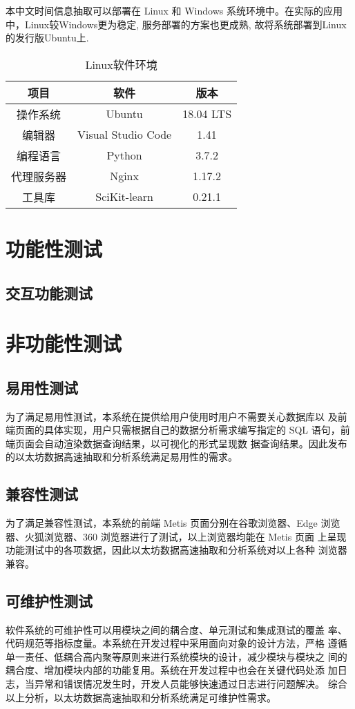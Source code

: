 本中文时间信息抽取可以部署在 Linux 和 Windows 系统环境中。在实际的应用
中，Linux较Windows更为稳定, 服务部署的方案也更成熟, 故将系统部署到Linux的发行版Ubuntu上.

\begin{table}[h]
    \centering
    \caption{Linux软件环境}
    \begin{tabular}{|*{3}{c|}}
        \hline
        项目 & 软件 & 版本 \\
        \hline
        操作系统 & Ubuntu  & 18.04 LTS \\
        \hline
        编辑器 & Visual Studio Code & 1.41 \\
        编程语言 & Python & 3.7.2 \\
        \hline
        代理服务器 & Nginx & 1.17.2 \\
        \hline
        工具库 & SciKit-learn &  0.21.1 \\
        \hline 
    \end{tabular}
\end{table}

\section{功能性测试}

\subsection{交互功能测试}

\section{非功能性测试}

\subsection{易用性测试}

为了满足易用性测试，本系统在提供给用户使用时用户不需要关心数据库以
及前端页面的具体实现，用户只需根据自己的数据分析需求编写指定的
SQL 语句，前端页面会自动渲染数据查询结果，以可视化的形式呈现数
据查询结果。因此发布的以太坊数据高速抽取和分析系统满足易用性的需求。

\subsection{兼容性测试}

为了满足兼容性测试，本系统的前端 Metis 页面分别在谷歌浏览器、Edge
浏览器、火狐浏览器、360 浏览器进行了测试，以上浏览器均能在 Metis 页面
上呈现功能测试中的各项数据，因此以太坊数据高速抽取和分析系统对以上各种
浏览器兼容。

\subsection{可维护性测试}

软件系统的可维护性可以用模块之间的耦合度、单元测试和集成测试的覆盖
率、代码规范等指标度量。本系统在开发过程中采用面向对象的设计方法，严格
遵循单一责任、低耦合高内聚等原则来进行系统模块的设计，减少模块与模块之
间的耦合度、增加模块内部的功能复用。系统在开发过程中也会在关键代码处添
加日志，当异常和错误情况发生时，开发人员能够快速通过日志进行问题解决。
综合以上分析，以太坊数据高速抽取和分析系统满足可维护性需求。

